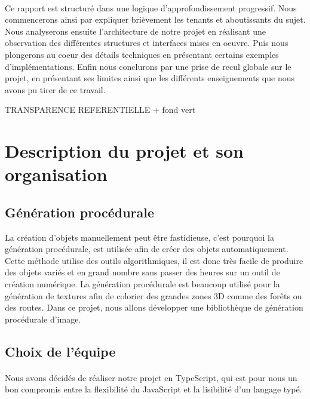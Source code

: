 \documentclass{article}
\begin{document}
\paragraph{}
Ce rapport est structuré dans une logique d'approfondissement progressif. Nous commencerons ainsi par expliquer brièvement les tenants et aboutissants du sujet.
Nous analyserons ensuite l'architecture de notre projet en réalisant une observation des différentes structures et interfaces mises en oeuvre.
Puis nous plongerons au coeur des détails techniques en présentant certains exemples d'implémentations.
Enfin nous conclurons par une prise de recul globale sur le projet, en présentant ses limites ainsi que les différents enseignements que nous avons pu tirer de ce travail. 

\newpage
\tableofcontents
\fancyhead[L]{\slshape \leftmark}
\newpage
TRANSPARENCE REFERENTIELLE + fond vert

\section{Description du projet et son organisation}
\subsection{Génération procédurale}

La création d'objets manuellement peut être fastidieuse, c'est pourquoi la génération procédurale, est utilisée afin de créer des objets automatiquement. Cette méthode utilise des outils algorithmiques, il est donc très facile de produire des objets variés  et en grand nombre sans passer des heures sur un outil de création numérique. La génération procédurale est beaucoup utilisé pour la génération de textures afin de colorier des grandes zones 3D comme des forêts ou des routes.
Dans ce projet, nous allons développer une bibliothèque de génération procédurale d'image.

\subsection{Choix de l'équipe}

\paragraph{}
Nous avons décidés de réaliser notre projet en TypeScript, qui est pour nous un bon compromis entre la flexibilité du JavaScript et la lisibilité d'un langage typé.
\end{document}

